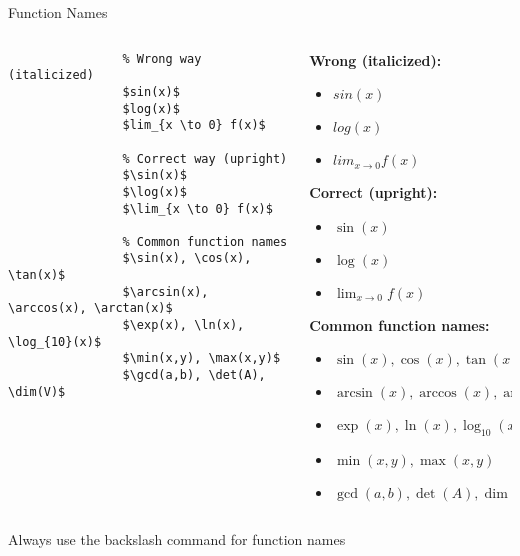 \begin{frame}[fragile]{Function Names}
    \begin{columns}
        \begin{column}{0.5\textwidth}
            \begin{lstlisting}
                % Wrong way (italicized)
                $sin(x)$
                $log(x)$
                $lim_{x \to 0} f(x)$
                
                % Correct way (upright)
                $\sin(x)$
                $\log(x)$
                $\lim_{x \to 0} f(x)$
                
                % Common function names
                $\sin(x), \cos(x), \tan(x)$
                $\arcsin(x), \arccos(x), \arctan(x)$
                $\exp(x), \ln(x), \log_{10}(x)$
                $\min(x,y), \max(x,y)$
                $\gcd(a,b), \det(A), \dim(V)$
            \end{lstlisting}
        \end{column}
        
        \begin{column}{0.5\textwidth}
            \textbf{Wrong (italicized):}
            \begin{itemize}
                \item $sin(x)$
                \item $log(x)$
                \item $lim_{x \to 0} f(x)$
            \end{itemize}
            
            \textbf{Correct (upright):}
            \begin{itemize}
                \item $\sin(x)$
                \item $\log(x)$
                \item $\lim_{x \to 0} f(x)$
            \end{itemize}
            
            \textbf{Common function names:}
            \begin{itemize}
                \item $\sin(x), \cos(x), \tan(x)$
                \item $\arcsin(x), \arccos(x), \arctan(x)$
                \item $\exp(x), \ln(x), \log_{10}(x)$
                \item $\min(x,y), \max(x,y)$
                \item $\gcd(a,b), \det(A), \dim(V)$
            \end{itemize}
        \end{column}
    \end{columns}
    
    \begin{tip}
        Always use the backslash command for function names
    \end{tip}
\end{frame}

